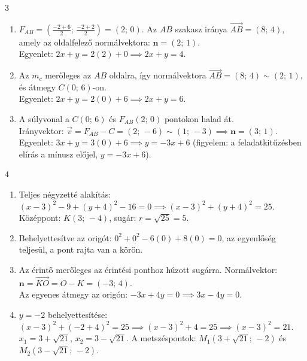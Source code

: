 \documentclass[11pt,a4paper]{article}
\begin{document}
\begin{megoldasbox}{3}
\begin{enumerate}
  \item $F_{AB} = \left(\frac{-2+6}{2};\, \frac{-2+2}{2}\right) = (2;\, 0)$. Az $AB$ szakasz iránya $\vec{AB} = (8;\, 4)$, amely az oldalfelező normálvektora: $\mathbf{n} = (2;\, 1)$.\\
        Egyenlet: $2x + y = 2(2) + 0 \implies 2x + y = 4$.
  \item Az $m_c$ merőleges az $AB$ oldalra, így normálvektora $\vec{AB} = (8;\, 4) \sim (2;\, 1)$, és átmegy $C(0;\, 6)$-on.\\
        Egyenlet: $2x + y = 2(0) + 6 \implies 2x + y = 6$.
  \item A súlyvonal a $C(0;\, 6)$ és $F_{AB}(2;\, 0)$ pontokon halad át.\\
        Irányvektor: $\vec{v} = F_{AB} - C = (2;\, -6) \sim (1;\, -3) \implies \mathbf{n} = (3;\, 1)$.\\
        Egyenlet: $3x + y = 3(0) + 6 \implies y = -3x + 6$ (figyelem: a feladatkitűzésben elírás a mínusz előjel, $y = -3x + 6$).
\end{enumerate}
\end{megoldasbox}

\begin{megoldasbox}{4}
\begin{enumerate}
  \item Teljes négyzetté alakítás: $(x - 3)^2 - 9 + (y + 4)^2 - 16 = 0 \implies (x - 3)^2 + (y + 4)^2 = 25$.\\
        Középpont: $K(3;\, -4)$, sugár: $r = \sqrt{25} = 5$.
  \item Behelyettesítve az origót: $0^2 + 0^2 - 6(0) + 8(0) = 0$, az egyenlőség teljesül, a pont rajta van a körön.
  \item Az érintő merőleges az érintési ponthoz húzott sugárra. Normálvektor: $\mathbf{n} = \vec{KO} = O - K = (-3;\, 4)$.\\
        Az egyenes átmegy az origón: $-3x + 4y = 0 \implies 3x - 4y = 0$.
  \item $y = -2$ behelyettesítése: $(x - 3)^2 + (-2 + 4)^2 = 25 \implies (x - 3)^2 + 4 = 25 \implies (x - 3)^2 = 21$.\\
        $x_1 = 3 + \sqrt{21}$, $x_2 = 3 - \sqrt{21}$. A metszéspontok: $M_1(3 + \sqrt{21};\, -2)$ és $M_2(3 - \sqrt{21};\, -2)$.
\end{enumerate}
\end{megoldasbox}
\end{document}
